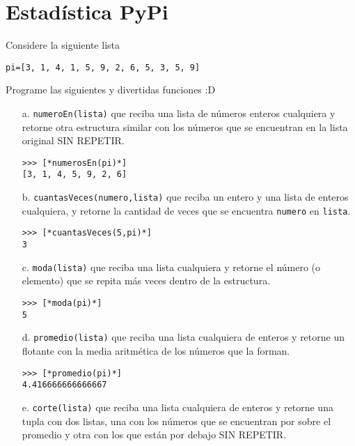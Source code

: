 \section{Estadística PyPi}

Considere la siguiente lista
\begin{lstlisting}[style=consola]
pi=[3, 1, 4, 1, 5, 9, 2, 6, 5, 3, 5, 9]
\end{lstlisting}

Programe las siguientes y divertidas funciones :D

\begin{itemize}

    \item[a.] \texttt{numeroEn(lista)} que reciba una lista de números enteros cualquiera y retorne otra estructura similar con los números que se encuentran en la lista original SIN REPETIR.
    
\begin{lstlisting}[style=consola]
>>> [*numerosEn(pi)*]
[3, 1, 4, 5, 9, 2, 6]
\end{lstlisting}

    \item[b.] \texttt{cuantasVeces(numero,lista)} que reciba un entero y una lista de enteros cualquiera, y retorne la cantidad de veces que se encuentra \texttt{numero} en \texttt{lista}.
    
\begin{lstlisting}[style=consola]
>>> [*cuantasVeces(5,pi)*]
3
\end{lstlisting}

    \item[c.] \texttt{moda(lista)} que reciba una lista cualquiera y retorne el número (o elemento) que se repita más veces dentro de la estructura.
    
\begin{lstlisting}[style=consola]
>>> [*moda(pi)*]
5
\end{lstlisting}

    \item[d.] \texttt{promedio(lista)} que reciba una lista cualquiera de enteros y retorne un flotante con la media aritmética de los números que la forman.
    
\begin{lstlisting}[style=consola]
>>> [*promedio(pi)*]
4.416666666666667
\end{lstlisting}

    \item[e.] \texttt{corte(lista)} que reciba una lista cualquiera de enteros y retorne una tupla con dos listas, una con los números que se encuentran por sobre el promedio y otra con los que están por debajo SIN REPETIR.


\end{itemize}
